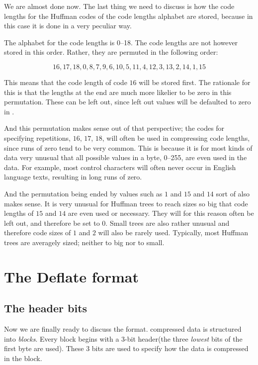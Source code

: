 We are almost done now. The last thing we need to discuss is how the
code lengths for the Huffman codes of the code lengths alphabet are
stored, because in this case it is done in a very peculiar way.

The alphabet for the code lengths is 0--18. The code lengths are not
however stored in this order. Rather, they are permuted in the
following order:

\begin{equation*}
  16, 17, 18, 0, 8, 7, 9, 6, 10, 5, 11, 4, 12, 3, 13, 2, 14, 1, 15
\end{equation*}

This means that the code length of code $16$ will be stored first. The
rationale for this is that the lengths at the end are much more
likelier to be zero in this permutation. These can be left out, since
left out values will be defaulted to zero in .

And this permutation makes sense out of that perspective; the codes
for specifying repetitions, $16$, $17$, $18$, will often be used in
compressing code lengths, since runs of zero tend to be very
common. This is because it is for most kinds of data very unusual that
all possible values in a byte, 0--255, are even used in the data. For
example, most \ascii control characters will often never occur in
English language texts, resulting in long runs of zero.

And the permutation being ended by values such as $1$ and $15$ and
$14$ sort of also makes sense. It is very unusual for Huffman trees to
reach sizes so big that code lengths of $15$ and $14$ are even used or
necessary. They will for this reason often be left out, and therefore
be set to $0$. Small trees are also rather unusual and therefore code
sizes of $1$ and $2$ will also be rarely used. Typically, most Huffman
trees are averagely sized; neither to big nor to small.

\section{The Deflate format}

\subsection{The header bits}

Now we are finally ready to discuss the  format. 
compressed data is structured into \textit{blocks}. Every block begins
with a 3-bit header(the three \textit{lowest} bits of the first byte
are used). These 3 bits are used to specify how the data is compressed
in the block.

